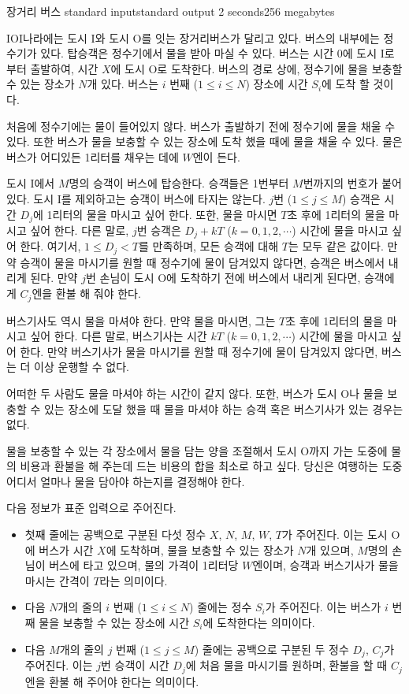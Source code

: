 \begin{problem}{장거리 버스}
	{standard input}{standard output}
	{2 seconds}{256 megabytes}{}
	
	IOI나라에는 도시 I와 도시 O를 잇는 장거리버스가 달리고 있다. 버스의 내부에는 정수기가 있다. 탑승객은 정수기에서 물을 받아 마실 수 있다. 버스는 시간 0에 도시 I로 부터 출발하여, 시간 $X$에 도시 O로 도착한다. 버스의 경로 상에, 정수기에 물을 보충할 수 있는 장소가 $N$개 있다. 버스는 $i$ 번째 ($1 \le i \le N$) 장소에 시간 $S_i$에 도착 할 것이다.
	
	처음에 정수기에는 물이 들어있지 않다. 버스가 출발하기 전에 정수기에 물을 채울 수 있다. 또한 버스가 물을 보충할 수 있는 장소에 도착 했을 때에 물을 채울 수 있다. 물은 버스가 어디있든 1리터를 채우는 데에 $W$엔이 든다.
	
	도시 I에서 $M$명의 승객이 버스에 탑승한다. 승객들은 1번부터 $M$번까지의 번호가 붙어있다. 도시 I를 제외하고는 승객이 버스에 타지는 않는다. $j$번 ($1 \le j \le M$) 승객은 시간 $D_j$에 1리터의 물을 마시고 싶어 한다. 또한, 물을 마시면 $T$초 후에 1리터의 물을 마시고 싶어 한다. 다른 말로, $j$번 승객은 $D_j + kT$ ($k = 0, 1, 2, \cdots$) 시간에 물을 마시고 싶어 한다. 여기서, $1 \le D_j < T$를 만족하며, 모든 승객에 대해 $T$는 모두 같은 값이다. 만약 승객이 물을 마시기를 원할 때 정수기에 물이 담겨있지 않다면, 승객은 버스에서 내리게 된다. 만약 $j$번 손님이 도시 O에 도착하기 전에 버스에서 내리게 된다면, 승객에게 $C_j$엔을 환불 해 줘야 한다.
	
	버스기사도 역시 물을 마셔야 한다. 만약 물을 마시면, 그는 $T$초 후에 1리터의 물을 마시고 싶어 한다. 다른 말로, 버스기사는 시간 $kT$ ($k= 0, 1, 2, \cdots$) 시간에 물을 마시고 싶어 한다. 만약 버스기사가 물을 마시기를 원할 때 정수기에 물이 담겨있지 않다면, 버스는 더 이상 운행할 수 없다.
	
	어떠한 두 사람도 물을 마셔야 하는 시간이 같지 않다. 또한, 버스가 도시 O나 물을 보충할 수 있는 장소에 도달 했을 때 물을 마셔야 하는 승객 혹은 버스기사가 있는 경우는 없다.
	
	물을 보충할 수 있는 각 장소에서 물을 담는 양을 조절해서 도시 O까지 가는 도중에 물의 비용과 환불을 해 주는데 드는 비용의 합을 최소로 하고 싶다. 당신은 여행하는 도중 어디서 얼마나 물을 담아야 하는지를 결정해야 한다.
	
	\InputFile
	
	다음 정보가 표준 입력으로 주어진다.
	
	\begin{itemize}
		\item 첫째 줄에는 공백으로 구분된 다섯 정수 $X$, $N$, $M$, $W$, $T$가 주어진다. 이는 도시 O에 버스가 시간 $X$에 도착하며, 물을 보충할 수 있는 장소가 $N$개 있으며, $M$명의 손님이 버스에 타고 있으며, 물의 가격이 1리터당 $W$엔이며, 승객과 버스기사가 물을 마시는 간격이 $T$라는 의미이다.
		\item 다음 $N$개의 줄의 $i$ 번째 ($1 \le i \le N$) 줄에는 정수 $S_i$가 주어진다. 이는 버스가 $i$ 번째 물을 보충할 수 있는 장소에 시간 $S_i$에 도착한다는 의미이다.
		\item 다음 $M$개의 줄의 $j$ 번째 ($1 \le j \le M$) 줄에는 공백으로 구분된 두 정수 $D_j$, $C_j$가 주어진다. 이는 $j$번 승객이 시간 $D_j$에 처음 물을 마시기를 원하며, 환불을 할 때 $C_j$엔을 환불 해 주어야 한다는 의미이다.
	\end{itemize}


\end{problem}
